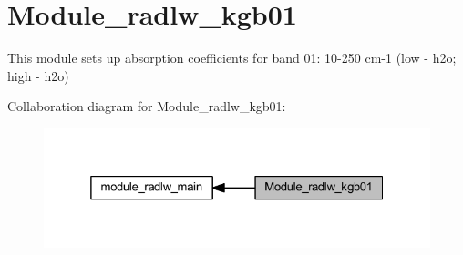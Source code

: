\hypertarget{group__module__radlw__kgb01}{}\section{Module\+\_\+radlw\+\_\+kgb01}
\label{group__module__radlw__kgb01}


This module sets up absorption coefficients for band 01\+: 10-\/250 cm-\/1 (low -\/ h2o; high -\/ h2o)  


Collaboration diagram for Module\+\_\+radlw\+\_\+kgb01\+:\nopagebreak
\begin{figure}[H]
\begin{center}
\leavevmode
\includegraphics[width=325pt]{group__module__radlw__kgb01}
\end{center}
\end{figure}
